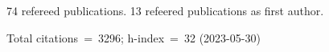 74 refereed publications. 13 refeered publications as first author.

Total citations~=~3296; h-index~=~32 (2023-05-30)